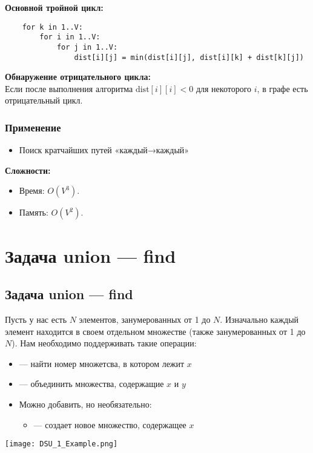\documentclass[a4paper]{article}
\begin{document}
\textbf{Основной тройной цикл:}
\begin{lstlisting}
    for k in 1..V:
        for i in 1..V:
            for j in 1..V:
                dist[i][j] = min(dist[i][j], dist[i][k] + dist[k][j])

\end{lstlisting}

\textbf{Обнаружение отрицательного цикла:}\\
Если после выполнения алгоритма \(\mathrm{dist}[i][i]<0\) для некоторого \(i\), в графе есть отрицательный цикл.

\subsubsection*{Применение}
\begin{itemize}
  \item Поиск кратчайших путей «каждый→каждый»
\end{itemize}

\textbf{Сложности:}
\begin{itemize}
  \item Время: \(O(V^3)\).
  \item Память: \(O(V^2)\).
\end{itemize}

\newpage
\section{Задача union — find}
\subsection{Задача union — find}
Пусть у нас есть $N$ элементов, занумерованных от 1 до $N$. Изначально каждый элемент находится в своем отдельном множестве (также занумерованных от 1 до $N$). Нам необходимо поддерживать такие операции:
\begin{itemize}
    \item {} — найти номер множетсва, в котором лежит $x$
    \item {} — объединить множества, содержащие $x$ и $y$
    \item Можно добавить, но необязательно:
    \begin{itemize}
        \item {} — создает новое множество, содержащее $x$ 
    \end{itemize}
\end{itemize}
\begin{center}
    \texttt{[image: DSU\_1\_Example.png]}
    \label{union-find}
\end{center}
\end{document}
